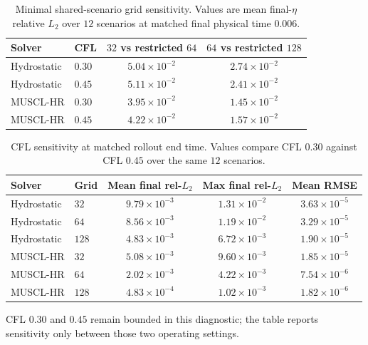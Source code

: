 \begin{table}[H]
\centering
\caption{Minimal shared-scenario grid sensitivity. Values are mean final-$\eta$ relative $L_2$ over $12$ scenarios at matched final physical time $0.006$.}
\label{tab:app-min-conv}
\small
\begin{tabular}{llcc}
    \toprule
    Solver & CFL & $32$ vs restricted $64$ & $64$ vs restricted $128$ \\
    \midrule
    Hydrostatic & $0.30$ & $5.04 \times 10 ^ {-2}$ & $2.74 \times 10 ^ {-2}$ \\
    Hydrostatic & $0.45$ & $5.11 \times 10 ^ {-2}$ & $2.41 \times 10 ^ {-2}$ \\
    MUSCL-HR    & $0.30$ & $3.95 \times 10 ^ {-2}$ & $1.45 \times 10 ^ {-2}$ \\
    MUSCL-HR    & $0.45$ & $4.22 \times 10 ^ {-2}$ & $1.57 \times 10 ^ {-2}$ \\
    \bottomrule
\end{tabular}
\end{table}

\begin{table}[H]
\centering
\caption{CFL sensitivity at matched rollout end time. Values compare CFL $0.30$ against CFL $0.45$ over the same $12$ scenarios.}
\label{tab:app-cfl}
\small
\setlength{\tabcolsep}{4pt}
\begin{tabular}{llccc}
    \toprule
    Solver & Grid & Mean final rel-$L_2$ & Max final rel-$L_2$ & Mean RMSE \\
    \midrule
    Hydrostatic & $32$  & $9.79 \times 10 ^ {-3}$ & $1.31 \times 10 ^ {-2}$ & $3.63 \times 10 ^ {-5}$ \\
    Hydrostatic & $64$  & $8.56 \times 10 ^ {-3}$ & $1.19 \times 10 ^ {-2}$ & $3.29 \times 10 ^ {-5}$ \\
    Hydrostatic & $128$ & $4.83 \times 10 ^ {-3}$ & $6.72 \times 10 ^ {-3}$ & $1.90 \times 10 ^ {-5}$ \\
    MUSCL-HR    & $32$  & $5.08 \times 10 ^ {-3}$ & $9.60 \times 10 ^ {-3}$ & $1.85 \times 10 ^ {-5}$ \\
    MUSCL-HR    & $64$  & $2.02 \times 10 ^ {-3}$ & $4.22 \times 10 ^ {-3}$ & $7.54 \times 10 ^ {-6}$ \\
    MUSCL-HR    & $128$ & $4.83 \times 10 ^ {-4}$ & $1.02 \times 10 ^ {-3}$ & $1.82 \times 10 ^ {-6}$ \\
    \bottomrule
\end{tabular}
\end{table}

CFL $0.30$ and $0.45$ remain bounded in this diagnostic; the table reports sensitivity only between those two operating settings.

